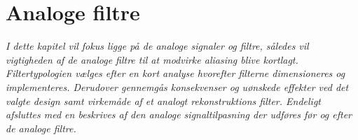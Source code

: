 \chapter{Analoge filtre}\label{kap:filtre}
\vspace*{0.5 cm}
\emph{I dette kapitel vil fokus ligge på de analoge signaler og filtre, således vil vigtigheden af de analoge filtre til at modvirke aliasing blive kortlagt. Filtertypologien vælges efter en kort analyse hvorefter filterne dimensioneres og implementeres. Derudover gennemgås konsekvenser og uønskede effekter ved det valgte design samt virkemåde af et analogt rekonstruktions filter. Endeligt afsluttes med en beskrives af den analoge signaltilpasning der udføres før og efter de analoge filtre.}
